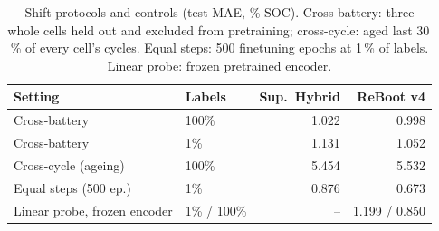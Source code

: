 \begin{table}[t]
\centering
\caption{Shift protocols and controls (test MAE, \% SOC). Cross-battery: three whole cells held out and excluded from pretraining; cross-cycle: aged last 30\,\% of every cell's cycles. Equal steps: 500 finetuning epochs at 1\,\% of labels. Linear probe: frozen pretrained encoder.}
\label{tab:extra}
\footnotesize
\begin{tabular}{llrr}
\toprule
Setting & Labels & Sup.\ Hybrid & ReBoot v4 \\
\midrule
Cross-battery & 100\% & 1.022 & 0.998 \\
Cross-battery & 1\% & 1.131 & 1.052 \\
Cross-cycle (ageing) & 100\% & 5.454 & 5.532 \\
Equal steps (500 ep.) & 1\% & 0.876 & 0.673 \\
Linear probe, frozen encoder & 1\% / 100\% & -- & 1.199 / 0.850 \\
\bottomrule
\end{tabular}
\end{table}
